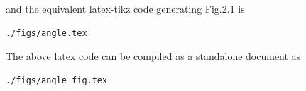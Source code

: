 \begin{enumerate}[label=\thesection.\arabic*.,ref=\thesection.\theenumi]
%
and the equivalent latex-tikz code generating Fig.2.1  is 
\begin{lstlisting}
./figs/angle.tex
\end{lstlisting}
%
The above latex code can be compiled as a standalone document as
\begin{lstlisting}
./figs/angle_fig.tex
\end{lstlisting}

%

%

%
%

\end{enumerate}

